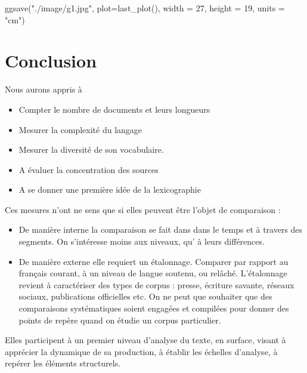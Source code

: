 \documentclass[
  letterpaper,
  DIV=11,
  numbers=noendperiod]{scrreprt}
\newenvironment{Shaded}{\begin{snugshade}}{\end{snugshade}}
\newcommand{\AttributeTok}[1]{\textcolor[rgb]{0.40,0.45,0.13}{#1}}
\newcommand{\DecValTok}[1]{\textcolor[rgb]{0.68,0.00,0.00}{#1}}
\newcommand{\FunctionTok}[1]{\textcolor[rgb]{0.28,0.35,0.67}{#1}}
\newcommand{\NormalTok}[1]{\textcolor[rgb]{0.00,0.23,0.31}{#1}}
\newcommand{\StringTok}[1]{\textcolor[rgb]{0.13,0.47,0.30}{#1}}
\providecommand{\tightlist}{%
  \setlength{\itemsep}{0pt}\setlength{\parskip}{0pt}}\usepackage{longtable,booktabs,array}
\begin{document}
\begin{Shaded}
\begin{Highlighting}[]
\FunctionTok{ggsave}\NormalTok{(}\StringTok{"./image/g1.jpg"}\NormalTok{, }\AttributeTok{plot=}\FunctionTok{last\_plot}\NormalTok{(), }\AttributeTok{width =} \DecValTok{27}\NormalTok{, }\AttributeTok{height =} \DecValTok{19}\NormalTok{, }\AttributeTok{units =} \StringTok{"cm"}\NormalTok{)}
\end{Highlighting}
\end{Shaded}

\section{Conclusion}\label{conclusion-4}

Nous aurons appris à

\begin{itemize}
\tightlist
\item
  Compter le nombre de documents et leurs longueurs
\item
  Mesurer la complexité du langage
\item
  Mesurer la diversité de son vocabulaire.
\item
  A évaluer la concentration des sources
\item
  A se donner une première idée de la lexicographie
\end{itemize}

Ces mesures n'ont ne sens que si elles peuvent être l'objet de
comparaison :

\begin{itemize}
\tightlist
\item
  De manière interne la comparaison se fait dans dans le temps et à
  travers des segments. On s'intéresse moins aux niveaux, qu' à leurs
  différences.
\item
  De manière externe elle requiert un étalonnage. Comparer par rapport
  au français courant, à un niveau de langue soutenu, ou relâché.
  L'étalonnage revient à caractériser des types de corpus : presse,
  écriture savante, réseaux sociaux, publications officielles etc. On ne
  peut que souhaiter que des comparaisons systématiques soient engagées
  et compilées pour donner des points de repère quand on étudie un
  corpus particulier.
\end{itemize}

Elles participent à un premier niveau d'analyse du texte, en surface,
visant à apprécier la dynamique de sa production, à établir les échelles
d'analyse, à repérer les éléments structurels.
\end{document}
